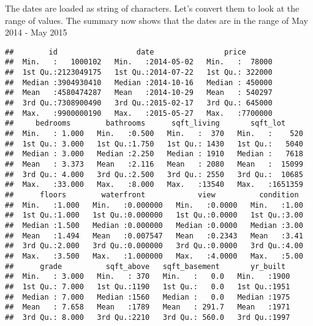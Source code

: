 \documentclass[]{article}
\newenvironment{Shaded}{\begin{snugshade}}{\end{snugshade}}
\newcommand{\CommentTok}[1]{\textcolor[rgb]{0.56,0.35,0.01}{\textit{#1}}}
\newcommand{\DataTypeTok}[1]{\textcolor[rgb]{0.13,0.29,0.53}{#1}}
\newcommand{\KeywordTok}[1]{\textcolor[rgb]{0.13,0.29,0.53}{\textbf{#1}}}
\newcommand{\NormalTok}[1]{#1}
\newcommand{\OperatorTok}[1]{\textcolor[rgb]{0.81,0.36,0.00}{\textbf{#1}}}
\newcommand{\StringTok}[1]{\textcolor[rgb]{0.31,0.60,0.02}{#1}}
\begin{document}
The dates are loaded as string of characters. Let's convert them to look
at the range of values. The summary now shows that the dates are in the
range of May 2014 - May 2015

\begin{Shaded}
\end{Shaded}

\begin{verbatim}
##        id                  date                price        
##  Min.   :   1000102   Min.   :2014-05-02   Min.   :  78000  
##  1st Qu.:2123049175   1st Qu.:2014-07-22   1st Qu.: 322000  
##  Median :3904930410   Median :2014-10-16   Median : 450000  
##  Mean   :4580474287   Mean   :2014-10-29   Mean   : 540297  
##  3rd Qu.:7308900490   3rd Qu.:2015-02-17   3rd Qu.: 645000  
##  Max.   :9900000190   Max.   :2015-05-27   Max.   :7700000  
##     bedrooms        bathrooms      sqft_living       sqft_lot      
##  Min.   : 1.000   Min.   :0.500   Min.   :  370   Min.   :    520  
##  1st Qu.: 3.000   1st Qu.:1.750   1st Qu.: 1430   1st Qu.:   5040  
##  Median : 3.000   Median :2.250   Median : 1910   Median :   7618  
##  Mean   : 3.373   Mean   :2.116   Mean   : 2080   Mean   :  15099  
##  3rd Qu.: 4.000   3rd Qu.:2.500   3rd Qu.: 2550   3rd Qu.:  10685  
##  Max.   :33.000   Max.   :8.000   Max.   :13540   Max.   :1651359  
##      floors        waterfront            view          condition   
##  Min.   :1.000   Min.   :0.000000   Min.   :0.0000   Min.   :1.00  
##  1st Qu.:1.000   1st Qu.:0.000000   1st Qu.:0.0000   1st Qu.:3.00  
##  Median :1.500   Median :0.000000   Median :0.0000   Median :3.00  
##  Mean   :1.494   Mean   :0.007547   Mean   :0.2343   Mean   :3.41  
##  3rd Qu.:2.000   3rd Qu.:0.000000   3rd Qu.:0.0000   3rd Qu.:4.00  
##  Max.   :3.500   Max.   :1.000000   Max.   :4.0000   Max.   :5.00  
##      grade          sqft_above   sqft_basement       yr_built   
##  Min.   : 3.000   Min.   : 370   Min.   :   0.0   Min.   :1900  
##  1st Qu.: 7.000   1st Qu.:1190   1st Qu.:   0.0   1st Qu.:1951  
##  Median : 7.000   Median :1560   Median :   0.0   Median :1975  
##  Mean   : 7.658   Mean   :1789   Mean   : 291.7   Mean   :1971  
##  3rd Qu.: 8.000   3rd Qu.:2210   3rd Qu.: 560.0   3rd Qu.:1997  

\end{verbatim}
\end{document}
